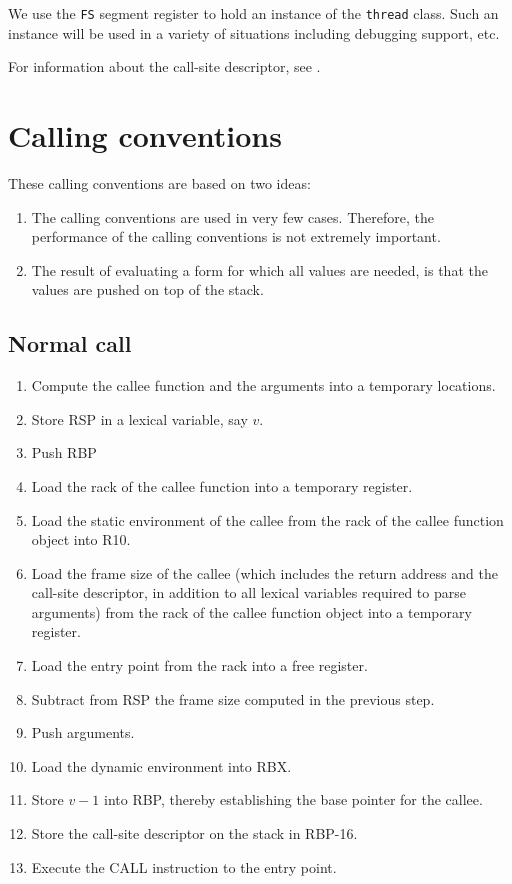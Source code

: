 We use the \texttt{FS} segment register to hold an instance of the
\texttt{thread} class.  Such an instance will be used in a variety of
situations including debugging support, etc.

For information about the call-site descriptor, see
.


\section{Calling conventions}

These calling conventions are based on two ideas:

\begin{enumerate}
\item The calling conventions are used in very few cases.  Therefore,
  the performance of the calling conventions is not extremely
  important.
\item The result of evaluating a form for which all values are needed,
  is that the values are pushed on top of the stack.
\end{enumerate}

\subsection{Normal call}

\begin{enumerate}
\item Compute the callee function and the arguments into a temporary
  locations.
\item Store RSP in a lexical variable, say $v$.
\item Push RBP
\item Load the rack of the callee function into a temporary register.
\item Load the static environment of the callee from the rack of the
  callee function object into R10.
\item Load the frame size of the callee (which
  includes the return address and the call-site descriptor, in
  addition to all lexical variables required to parse arguments) from
  the rack of the callee function object into a temporary register.
\item Load the entry point from the rack into a free register.
\item Subtract from RSP the frame size computed in the
  previous step.
\item Push arguments.
\item Load the dynamic environment into RBX.
\item Store $v-1$ into RBP, thereby establishing the base pointer
  for the callee.
\item Store the call-site descriptor on the stack in RBP-16.
\item Execute the CALL instruction to the entry point.
\end{enumerate}


